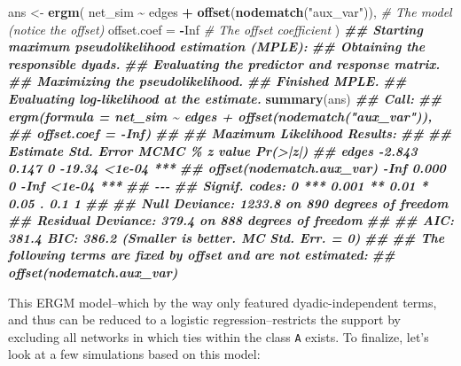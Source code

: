 \documentclass[
]{book}
\newenvironment{Shaded}{\begin{snugshade}}{\end{snugshade}}
\newcommand{\AttributeTok}[1]{\textcolor[rgb]{0.13,0.29,0.53}{#1}}
\newcommand{\CommentTok}[1]{\textcolor[rgb]{0.56,0.35,0.01}{\textit{#1}}}
\newcommand{\ConstantTok}[1]{\textcolor[rgb]{0.56,0.35,0.01}{#1}}
\newcommand{\DocumentationTok}[1]{\textcolor[rgb]{0.56,0.35,0.01}{\textbf{\textit{#1}}}}
\newcommand{\FunctionTok}[1]{\textcolor[rgb]{0.13,0.29,0.53}{\textbf{#1}}}
\newcommand{\NormalTok}[1]{#1}
\newcommand{\OtherTok}[1]{\textcolor[rgb]{0.56,0.35,0.01}{#1}}
\newcommand{\SpecialCharTok}[1]{\textcolor[rgb]{0.81,0.36,0.00}{\textbf{#1}}}
\newcommand{\StringTok}[1]{\textcolor[rgb]{0.31,0.60,0.02}{#1}}
\begin{document}
\begin{Shaded}
\begin{Highlighting}[]
\NormalTok{ans }\OtherTok{\textless{}{-}} \FunctionTok{ergm}\NormalTok{(}
\NormalTok{  net\_sim }\SpecialCharTok{\textasciitilde{}}\NormalTok{ edges }\SpecialCharTok{+} \FunctionTok{offset}\NormalTok{(}\FunctionTok{nodematch}\NormalTok{(}\StringTok{"aux\_var"}\NormalTok{)), }\CommentTok{\# The model (notice the offset)}
  \AttributeTok{offset.coef =} \SpecialCharTok{{-}}\ConstantTok{Inf}                              \CommentTok{\# The offset coefficient}
\NormalTok{  )}
\DocumentationTok{\#\# Starting maximum pseudolikelihood estimation (MPLE):}
\DocumentationTok{\#\# Obtaining the responsible dyads.}
\DocumentationTok{\#\# Evaluating the predictor and response matrix.}
\DocumentationTok{\#\# Maximizing the pseudolikelihood.}
\DocumentationTok{\#\# Finished MPLE.}
\DocumentationTok{\#\# Evaluating log{-}likelihood at the estimate.}
\FunctionTok{summary}\NormalTok{(ans)}
\DocumentationTok{\#\# Call:}
\DocumentationTok{\#\# ergm(formula = net\_sim \textasciitilde{} edges + offset(nodematch("aux\_var")), }
\DocumentationTok{\#\#     offset.coef = {-}Inf)}
\DocumentationTok{\#\# }
\DocumentationTok{\#\# Maximum Likelihood Results:}
\DocumentationTok{\#\# }
\DocumentationTok{\#\#                           Estimate Std. Error MCMC \% z value Pr(\textgreater{}|z|)    }
\DocumentationTok{\#\# edges                       {-}2.843      0.147      0  {-}19.34   \textless{}1e{-}04 ***}
\DocumentationTok{\#\# offset(nodematch.aux\_var)     {-}Inf      0.000      0    {-}Inf   \textless{}1e{-}04 ***}
\DocumentationTok{\#\# {-}{-}{-}}
\DocumentationTok{\#\# Signif. codes:  0 \textquotesingle{}***\textquotesingle{} 0.001 \textquotesingle{}**\textquotesingle{} 0.01 \textquotesingle{}*\textquotesingle{} 0.05 \textquotesingle{}.\textquotesingle{} 0.1 \textquotesingle{} \textquotesingle{} 1}
\DocumentationTok{\#\# }
\DocumentationTok{\#\#      Null Deviance: 1233.8  on 890  degrees of freedom}
\DocumentationTok{\#\#  Residual Deviance:  379.4  on 888  degrees of freedom}
\DocumentationTok{\#\#  }
\DocumentationTok{\#\# AIC: 381.4  BIC: 386.2  (Smaller is better. MC Std. Err. = 0)}
\DocumentationTok{\#\# }
\DocumentationTok{\#\#  The following terms are fixed by offset and are not estimated:}
\DocumentationTok{\#\#   offset(nodematch.aux\_var)}
\end{Highlighting}
\end{Shaded}

This ERGM model--which by the way only featured dyadic-independent terms, and thus can be reduced to a logistic regression--restricts the support by excluding all networks in which ties within the class \texttt{A} exists. To finalize, let's look at a few simulations based on this model:
\end{document}

